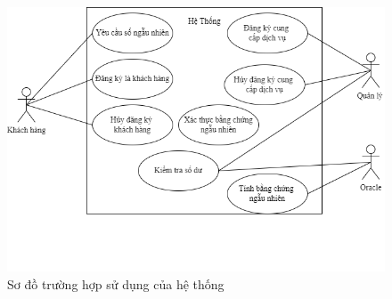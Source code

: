 \documentclass[../main.tex]{subfiles}
\begin{document}
\begin{figure}[H]
    \centering
    \includegraphics[scale = 0.6]{Figure/systemOverview.png}
    \caption{Sơ đồ trường hợp sử dụng của hệ thống}
    \label{fig:systemOverview}
\end{figure}
\end{document}
